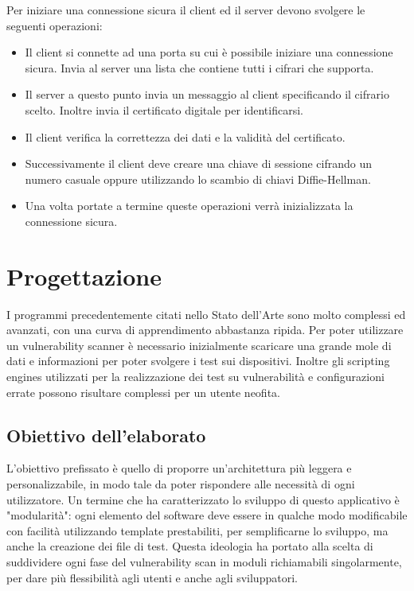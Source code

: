 \documentclass[12pt]{report}
\begin{document}
Per iniziare una connessione sicura il client ed il server devono svolgere le seguenti operazioni:
\begin{itemize}
    \item Il client si connette ad una porta su cui è possibile iniziare una connessione sicura. Invia al server una lista che contiene tutti i cifrari che supporta.
    \item Il server a questo punto invia un messaggio al client specificando il cifrario scelto. Inoltre invia il certificato digitale per identificarsi.
    \item Il client verifica la correttezza dei dati e la validità del certificato.
    \item Successivamente il client deve creare una chiave di sessione cifrando un numero casuale oppure utilizzando lo scambio di chiavi Diffie-Hellman.
    \item Una volta portate a termine queste operazioni verrà inizializzata la connessione sicura.
\end{itemize}

% 
% 

\chapter{Progettazione}
\label{cap:progettazione}

I programmi precedentemente citati nello Stato dell'Arte sono molto complessi ed avanzati, con una curva di apprendimento abbastanza ripida. Per poter utilizzare un vulnerability scanner è necessario inizialmente scaricare una grande mole di dati e informazioni per poter svolgere i test sui dispositivi. Inoltre gli scripting engines utilizzati per la realizzazione dei test su vulnerabilità e configurazioni errate possono risultare complessi per un utente neofita.

\section{Obiettivo dell'elaborato}

L'obiettivo prefissato è quello di proporre un'architettura più leggera e personalizzabile, in modo tale da poter rispondere alle necessità di ogni utilizzatore. Un termine che ha caratterizzato lo sviluppo di questo applicativo è "modularità": ogni elemento del software deve essere in qualche modo modificabile con facilità utilizzando template prestabiliti, per semplificarne lo sviluppo, ma anche la creazione dei file di test. Questa ideologia ha portato alla scelta di suddividere ogni fase del vulnerability scan in moduli richiamabili singolarmente, per dare più flessibilità agli utenti e anche agli sviluppatori. 
\end{document}
